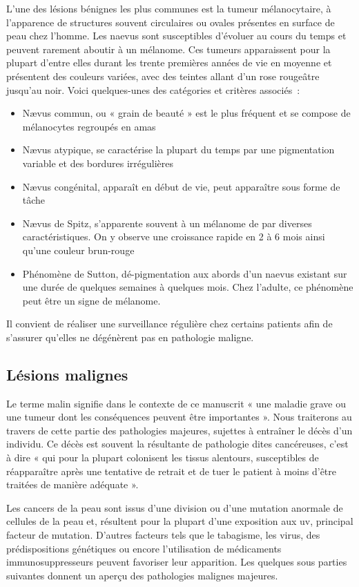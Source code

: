 L'une des lésions bénignes les plus communes est la tumeur mélanocytaire, à l’apparence de structures souvent circulaires ou ovales présentes en surface de peau chez l’homme. Les naevus sont susceptibles d’évoluer au cours du temps et peuvent rarement aboutir à un mélanome. Ces tumeurs apparaissent pour la plupart d'entre elles durant les trente premières années de vie en moyenne et présentent des couleurs variées, avec des teintes allant d'un rose rougeâtre jusqu'au noir. Voici quelques-unes des catégories et critères associés~:
\begin{itemize}
    \item Nævus commun, ou « grain de beauté » est le plus fréquent et se compose de mélanocytes regroupés en amas
    \item Nævus atypique, se caractérise la plupart du temps par une pigmentation variable et des bordures irrégulières
    \item Nævus congénital, apparaît en début de vie, peut apparaître sous forme de tâche
    \item Nævus de Spitz, s’apparente souvent à un mélanome de par diverses caractéristiques. On y observe une croissance rapide en 2 à 6 mois ainsi qu’une couleur brun-rouge
    \item Phénomène de Sutton, dé-pigmentation aux abords d’un naevus existant sur une durée de quelques semaines à quelques mois. Chez l’adulte, ce phénomène peut être un signe de mélanome.
\end{itemize}
Il convient de réaliser une surveillance régulière chez certains patients afin de s'assurer qu'elles ne dégénèrent pas en pathologie maligne.\par

\subsection{Lésions malignes}
Le terme malin signifie dans le contexte de ce manuscrit « une maladie grave ou une tumeur dont les conséquences peuvent être importantes ». 
Nous traiterons au travers de cette partie des pathologies majeures, sujettes à entraîner le décès d’un individu. Ce décès est souvent la résultante de pathologie dites cancéreuses, c'est à dire « qui pour la plupart colonisent les tissus alentours, susceptibles de réapparaître après une tentative de retrait et de tuer le patient à moins d’être traitées de manière adéquate ».\par

Les cancers de la peau sont issus d’une division ou d’une mutation anormale de cellules de la peau et, résultent pour la plupart d’une exposition aux \gls{uv}, principal facteur de mutation. D’autres facteurs tels que le tabagisme, les virus, des prédispositions génétiques ou encore l’utilisation de médicaments immunosuppresseurs peuvent favoriser leur apparition. Les quelques sous parties suivantes donnent un aperçu des pathologies malignes majeures.\par

